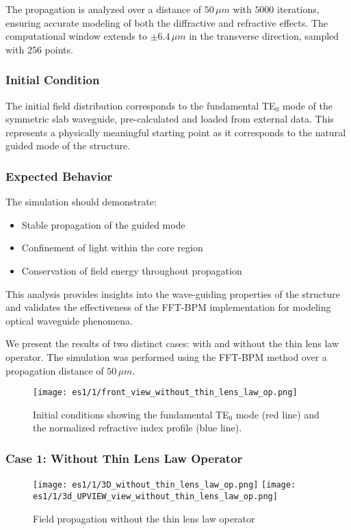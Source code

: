 \documentclass{article}
\begin{document}
The propagation is analyzed over a distance of $50\,\mu m$ with $5000$ iterations, ensuring accurate modeling of both the diffractive and refractive effects. The computational window extends to $\pm 6.4\,\mu m$ in the transverse direction, sampled with $256$ points.

\subsubsection{Initial Condition}
The initial field distribution corresponds to the fundamental TE$_0$ mode of the symmetric slab waveguide, pre-calculated and loaded from external data. This represents a physically meaningful starting point as it corresponds to the natural guided mode of the structure.

\subsubsection{Expected Behavior}
The simulation should demonstrate:
\begin{itemize}
    \item Stable propagation of the guided mode
    \item Confinement of light within the core region
    \item Conservation of field energy throughout propagation
\end{itemize}

This analysis provides insights into the wave-guiding properties of the structure and validates the effectiveness of the FFT-BPM implementation for modeling optical waveguide phenomena.

We present the results of two distinct cases: with and without the thin lens law operator. The simulation was performed using the FFT-BPM method over a propagation distance of $50 \,\mu m$.

\begin{figure}[h]
\centering
\texttt{[image: es1/1/front\_view\_without\_thin\_lens\_law\_op.png]}
\caption{Initial conditions showing the fundamental TE$_0$ mode (red line) and the normalized refractive index profile (blue line).}
\label{fig:initial}
\end{figure}

\subsubsection{Case 1: Without Thin Lens Law Operator}
\begin{figure}[h]
\centering
\texttt{[image: es1/1/3D\_without\_thin\_lens\_law\_op.png]}
\texttt{[image: es1/1/3d\_UPVIEW\_view\_without\_thin\_lens\_law\_op.png]}
\caption{Field propagation without the thin lens law operator}
\label{fig:no_lens}
\end{figure}
\end{document}
